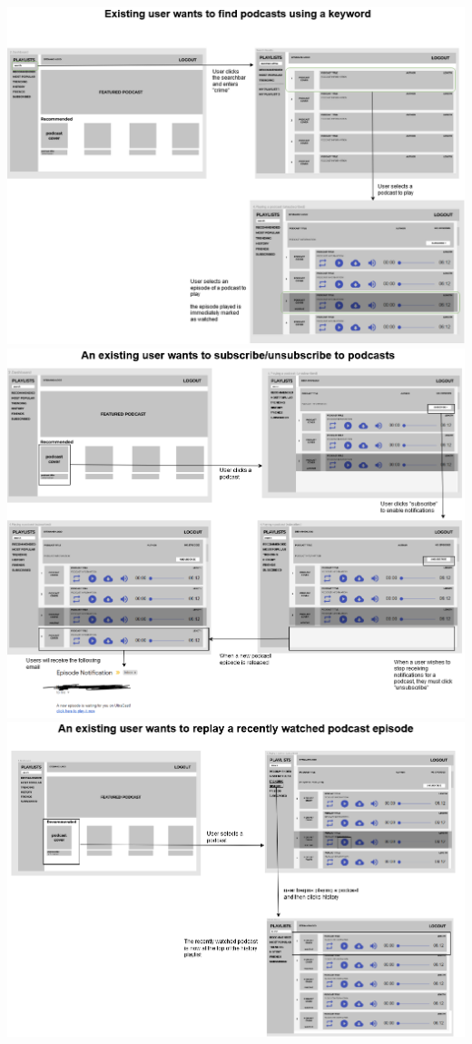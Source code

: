 \documentclass[12pt]{article}
\begin{document}
\begin{appendices}
\begin{center}
        \includegraphics[width=\textwidth]{resources/search}
        \includegraphics[width=\textwidth]{resources/subscribe}
        \includegraphics[width=\textwidth]{resources/history}

\end{center}
\end{appendices}
\end{document}
